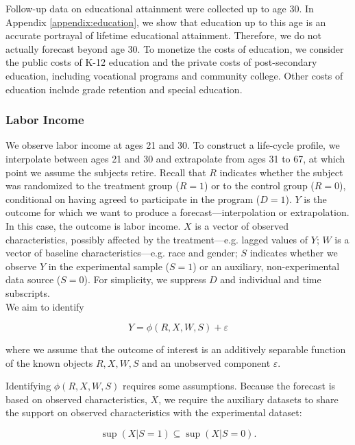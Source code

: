 Follow-up data on educational attainment were collected up to age 30. In Appendix \ref{appendix:education}, we show that education up to this age is an accurate portrayal of lifetime educational attainment. Therefore, we do not actually forecast beyond age 30. To monetize the costs of education, we consider the public costs of K-12 education and the private costs of post-secondary education, including vocational programs and community college. Other costs of education include grade retention and special education.

\subsubsection{Labor Income}

We observe labor income at ages 21 and 30. To construct a life-cycle profile, we interpolate between ages 21 and 30 and extrapolate from ages 31 to 67, at which point we assume the subjects retire. Recall that $R$ indicates whether the subject was randomized to the treatment group ($R=1$) or to the control group ($R=0$), conditional on having agreed to participate in the program ($D = 1$). $Y$ is the outcome for which we want to produce a forecast---interpolation or extrapolation. In this case, the outcome is labor income. $X$ is a vector of observed characteristics, possibly affected by the treatment---e.g. lagged values of $Y$; $W$ is a vector of baseline characteristics---e.g. race and gender; $S$ indicates whether we observe $Y$ in the experimental sample ($S=1$) or an auxiliary, non-experimental data source ($S=0$). For simplicity, we suppress $D$ and individual and time subscripts. \\

We aim to identify

\begin{equation}
Y = \phi \left( R, X, W, S \right) + \varepsilon \label{eq:forecast-param}
\end{equation}

\noindent where we assume that the outcome of interest is an additively separable function of the known objects $R, X, W, S$ and an unobserved component $\varepsilon$.

Identifying $\phi \left( R, X, W, S \right)$ requires some assumptions. Because the forecast is based on observed characteristics, $X$, we require the auxiliary datasets to share the support on observed characteristics with the experimental dataset:

\begin{equation}
\sup \left( X | S = 1 \right) \subseteq \sup \left( X | S = 0 \right).
\end{equation}

